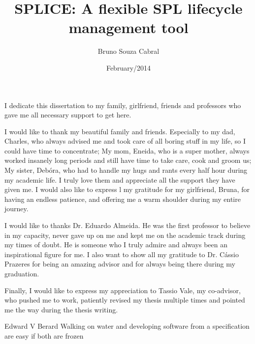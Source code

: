 \documentclass[en,twoside,onehalfspacing,bsc]{risethesis}
\title{SPLICE: A flexible SPL lifecycle management tool}
\date{February/2014}
\author{Bruno Souza Cabral}
\begin{document}
\frontmatter
\frontpage
\presentationpage

\begin{dedicatory}
I dedicate this dissertation to my family, girlfriend, friends and
professors who gave me all necessary support to get here.
\end{dedicatory}

\acknowledgements
I would like to thank my beautiful family and friends. Especially to my dad, Charles, who always advised me and took care of all boring stuff in my life, so I could have time to concentrate; My mom, Eneida, who is a super mother, always worked insanely long periods and still have time to take care, cook and groom us; My sister, Debóra,  who had to handle my hugs and rants every half hour during my academic life. I truly love them and appreciate all the support they have given me. I would also like to express l my gratitude for my girlfriend, Bruna, for having an endless patience, and offering me a warm shoulder during my entire journey.

I would like to thanks Dr. Eduardo Almeida. He was the first professor to believe in my capacity, never gave up on me and kept me on the academic track during my times of doubt. He is someone who I truly admire and always been an inspirational figure for me. I also want to show all my gratitude to Dr. Cássio Prazeres for being an amazing advisor and for always being there during my graduation.

Finally, I would like to express my appreciation to Tassio Vale, my co-advisor, who pushed me to work, patiently revised my thesis multiple times and pointed me the way during the thesis writing.




\begin{epigraph}[]{Edward V Berard}
Walking on water and developing software from a specification are easy if both are frozen
\end{epigraph}

\resumo


\abstract


\tableofcontents

\listoffigures

\listoftables

\listofacronyms



\mainmatter











\clearpage
\addappheadtotoc
\appendix
\appendixpage

\end{document}

